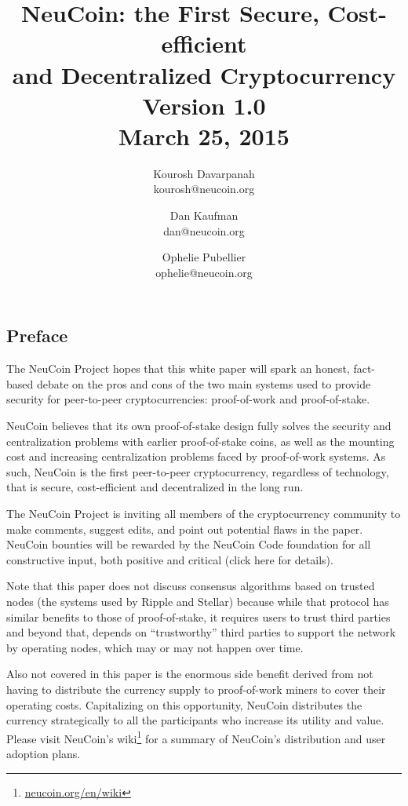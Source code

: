 \documentclass[a4paper,11pt]{article}
\title{\vspace{-5mm}NeuCoin: the First Secure, Cost-efficient\\ and Decentralized Cryptocurrency\\
  \vspace{8mm}
  \large Version 1.0\\ March 25, 2015\vspace{3mm}}
\author{
  Kourosh Davarpanah\\
  kourosh@neucoin.org
  \and
  Dan Kaufman\\
  dan@neucoin.org
  \and
  Ophelie Pubellier\\
  ophelie@neucoin.org
\vspace{3mm}}
\date{}
\begin{document}
\maketitle 


\subsection*{Preface}

The NeuCoin Project hopes that this white paper will spark an honest, fact-based debate on the pros and cons of the two main systems used to provide security for peer-to-peer cryptocurrencies: proof-of-work and proof-of-stake. 
 
NeuCoin believes that its own proof-of-stake design fully solves the security and centralization problems with earlier proof-of-stake coins, as well as the mounting cost and increasing centralization problems faced by proof-of-work systems. As such, NeuCoin is the first peer-to-peer cryptocurrency, regardless of technology, that is secure, cost-efficient and decentralized in the long run.

The NeuCoin Project is inviting all members of the cryptocurrency community to make comments, suggest edits, and point out potential flaws in the paper. NeuCoin bounties will be rewarded by the NeuCoin Code foundation for all constructive input, both positive and critical (click here for details).

Note that this paper does not discuss consensus algorithms based on trusted nodes (the systems used by Ripple and Stellar) because while that protocol has similar benefits to those of proof-of-stake, it requires users to trust third parties and beyond that, depends on “trustworthy” third parties to support the network by operating nodes, which may or may not happen over time.

Also not covered in this paper is the enormous side benefit derived from not having to distribute the currency supply to proof-of-work miners to cover their operating costs. Capitalizing on this opportunity, NeuCoin distributes the currency strategically to all the participants who increase its utility and value. Please visit NeuCoin's wiki\footnote{\href{http://www.neucoin.org/en/wiki/}{neucoin.org/en/wiki}} for a summary of NeuCoin's distribution and user adoption plans.

\newpage
\end{document}
